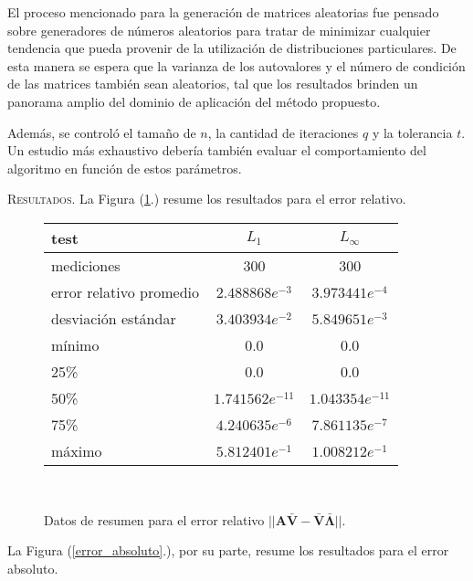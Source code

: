 El proceso mencionado para la generación de matrices aleatorias fue pensado sobre generadores de números aleatorios para tratar de minimizar cualquier tendencia que pueda provenir de la utilización de distribuciones particulares. De esta manera se espera que la varianza de los autovalores y el número de condición de las matrices también sean aleatorios, tal que los resultados brinden un panorama amplio del dominio de aplicación del método propuesto. 

Además, se controló el tamaño de $n$, la cantidad de iteraciones $q$ y la tolerancia $t$. Un estudio más exhaustivo debería también evaluar el comportamiento del algoritmo en función de estos parámetros.

\vspace{2em}
\noindent \textsc{Resultados}. La Figura (\ref{error_relativo}.) resume los resultados para el error relativo.

\vspace{1em}
\begin{figure}[!htbp]
    \begin{tabular}{ |l|c|c| } 
    \hline
    test                    & $L_1$             & $L_\infty$ \\
    \hline
    mediciones              & 300               & 300 \\
    error relativo promedio & $2.488868e^{-3}$  & $3.973441e^{-4}$ \\
    desviación estándar     & $3.403934e^{-2}$  & $5.849651e^{-3}$ \\
    mínimo                  & 0.0               & 0.0 \\
    25\%                    & 0.0               & 0.0 \\
    50\%                    & $1.741562e^{-11}$ & $1.043354e^{-11}$ \\
    75\%                    & $4.240635e^{-6}$  & $7.861135e^{-7}$ \\
    máximo                  & $5.812401e^{-1}$  & $1.008212e^{-1}$ \\
    \hline
    \end{tabular} \\
    \bigskip
    \caption{Datos de resumen para el error relativo $||\mathbf{A} \mathbf{\bar{V}} - \mathbf{\bar{V}} \mathbf{\bar{\Lambda}}||$.} \label{error_relativo}
\end{figure}

\vspace{1em}
\noindent La Figura (\ref{error_absoluto}.), por su parte, resume los resultados para el error absoluto.

